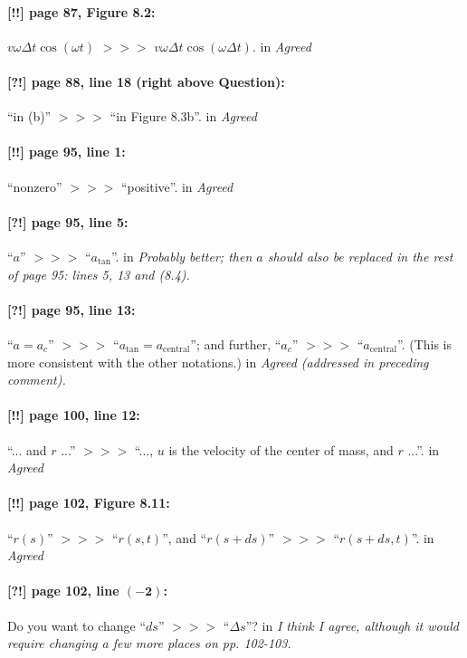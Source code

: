 \documentclass[twoside]{article}
\begin{document}
\paragraph{[!!] page 87, Figure 8.2:} $v\omega\Delta t\cos(\omega t)$ $>\!>\!>$ $v\omega\Delta t\cos(\omega \Delta t)$.
 in {\it  Agreed} 

\paragraph{[?!] page 88, line 18 (right above Question):} “in (b)” $>\!>\!>$ “in Figure 8.3b”.
 in {\it  Agreed} 

\paragraph{[!!] page 95, line 1:} “nonzero” $>\!>\!>$ “positive”.
 in {\it  Agreed} 

\paragraph{[?!] page 95, line 5:} “$a$” $>\!>\!>$ “$a_{\mathrm{tan}}$”.
 in {\it  Probably better;  then $a$  should also be replaced in the rest of page 95: lines 5, 13 and (8.4). } 

\paragraph{[?!] page 95, line 13:} “$a=a_c$” $>\!>\!>$ “$a_{\mathrm{tan}} = a_{\mathrm{central}}$”; and further,
“$a_c$” $>\!>\!>$ “$a_{\mathrm{central}}$”. (This is more consistent with the other notations.)
 in {\it  Agreed (addressed in preceding comment).  } 

\paragraph{[!!] page 100, line 12:} “... and $r$ ...” $>\!>\!>$ “..., $u$ is the velocity of the center of mass, and $r$ ...”.
 in {\it  Agreed} 

\paragraph{[!!] page 102, Figure 8.11:} “$r(s)$” $>\!>\!>$ “$r(s,t)$”,
and “$r(s+ds)$” $>\!>\!>$ “$r(s+ds,t)$”.
 in {\it  Agreed} 


\paragraph{[?!] page 102, line $\bm{(-2)}$:} Do you want to change “$ds$” $>\!>\!>$ “$\Delta s$”?
 in {\it I think I agree, although it would require changing a few more places on pp. 102-103.} 
\end{document}
